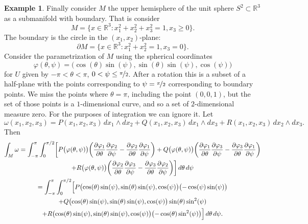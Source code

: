 \documentclass[12pt,openany]{book}
\newcommand{\R}{{\mathbb{R}}}
\theoremstyle{plain}
\theoremstyle{remark}
\theoremstyle{definition}
\theoremstyle{exercise}
\theoremstyle{example}
\newtheorem{example}[thm]{Example}
\begin{document}
\begin{example}
Finally consider $M$
the upper hemisphere of the unit sphere $S^2 \subset \R^3$ as a submanifold
with boundary.  That is consider
\begin{equation*}
M = \bigl\{ x \in \R^3 : x_1^2+x_2^2+x_3^2=1, x_3 \geq 0 \bigr\} .
\end{equation*}
The boundary is the circle in the $(x_1,x_2)$-plane:
\begin{equation*}
\partial M = \bigl\{ x \in \R^3 : x_1^2+x_2^2=1, x_3 = 0 \bigr\} .
\end{equation*}
Consider the parametrization of $M$ using the spherical coordinates
\begin{equation*}
\varphi(\theta,\psi) =
\bigl(\cos(\theta) \sin(\psi),
 \sin(\theta) \sin(\psi),
 \cos(\psi)\bigr)
\end{equation*}
for $U$ given by $-\pi < \theta < \pi$, $0 < \psi \leq \nicefrac{\pi}{2}$.  After
a rotation this is a subset of a half-plane with the points corresponding to
$\psi = \nicefrac{\pi}{2}$ corresponding to boundary points.  We miss the
points where $\theta = \pi$, including the point $(0,0,1)$, but the set of
those points is a $1$-dimensional curve, and so a set of $2$-dimensional
measure zero. For the purposes of integration we can ignore it.
Let
\begin{equation*}
\omega(x_1,x_2,x_3) =
P(x_1,x_2,x_3) \, dx_1 \wedge dx_2
+ Q(x_1,x_2,x_3) \, dx_1 \wedge dx_3
+ R(x_1,x_2,x_3) \, dx_2 \wedge dx_3 .
\end{equation*}
Then
\begin{multline*}
\int_M \omega = 
\int_{-\pi}^\pi
\int_{0}^{\pi/2}
\biggl[
P\bigl(\varphi(\theta,\psi)\bigr) \biggl(
\frac{\partial \varphi_1}{\partial \theta}
\frac{\partial \varphi_2}{\partial \psi}
-
\frac{\partial \varphi_2}{\partial \theta}
\frac{\partial \varphi_1}{\partial \psi}
\biggr)
+
Q\bigl(\varphi(\theta,\psi)\bigr) \biggl(
\frac{\partial \varphi_1}{\partial \theta}
\frac{\partial \varphi_3}{\partial \psi}
-
\frac{\partial \varphi_3}{\partial \theta}
\frac{\partial \varphi_1}{\partial \psi}
\biggr)
\\
+
R\bigl(\varphi(\theta,\psi)\bigr) \biggl(
\frac{\partial \varphi_2}{\partial \theta}
\frac{\partial \varphi_3}{\partial \psi}
-
\frac{\partial \varphi_3}{\partial \theta}
\frac{\partial \varphi_2}{\partial \psi}
\biggr)
\biggr]\, d\theta \, d\psi
\\
=
\int_{-\pi}^\pi
\int_{0}^{\pi/2}
\Bigl[
P\bigl(\cos(\theta)\sin(\psi),\sin(\theta)\sin(\psi),\cos(\psi)\bigr)
\bigl(-\cos(\psi)\sin(\psi) \bigr)
\\
+
Q\bigl(\cos(\theta)\sin(\psi),\sin(\theta)\sin(\psi),\cos(\psi)\bigr)
\sin(\theta)\sin^2(\psi)
\\
+
R\bigl(\cos(\theta)\sin(\psi),\sin(\theta)\sin(\psi),\cos(\psi)\bigr) 
\bigl(-\cos(\theta)\sin^2(\psi)\bigr)
\Bigr]
\,
d\theta
\,
d\psi .
\end{multline*}


\end{example}
\end{document}
